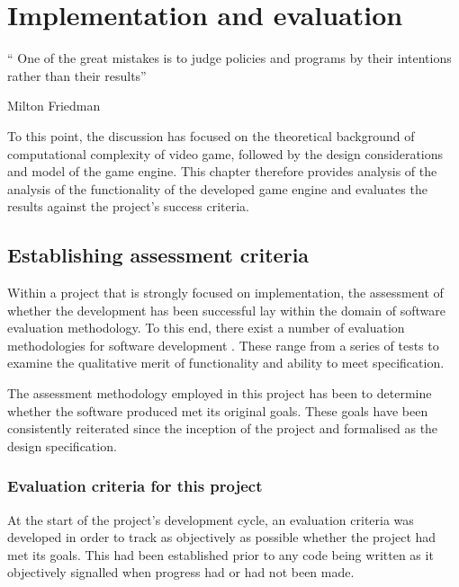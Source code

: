 \documentclass[11pt, a4paper, oneside]{report} %
\begin{document}

\chapter{Implementation and evaluation}

\epigraph{`` One of the great mistakes is to judge policies and programs by
their intentions rather than their results''}{Milton Friedman}

To this point, the discussion has focused on the theoretical background of
computational complexity of video game, followed by the design considerations
and model of the game engine.  This chapter therefore provides analysis of the
analysis of the functionality of the developed game engine and
evaluates the results against the project's success criteria.

\section{Establishing assessment criteria}

Within a project that is strongly focused on implementation, the assessment of
whether the development has been successful lay within the domain of software
evaluation methodology. To this end, there exist a number of evaluation
methodologies for software development \cite{unterkalmsteiner2012evaluation}.
These range from a series of tests to examine the qualitative merit of
functionality and ability to meet specification.

The assessment methodology employed in this project has been to determine
whether the software produced met its original goals. These goals have been
consistently reiterated since the inception of the project and formalised as the
design specification.

\subsection{Evaluation criteria for this project}

At the start of the project's development cycle, an evaluation criteria was
developed in order to track as objectively as possible whether the project had
met its goals. This had been established prior to any code being written as it
objectively signalled when progress had or had not been made.
\end{document}
